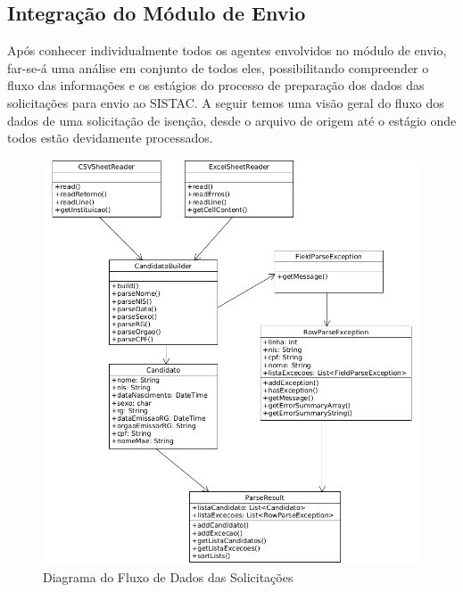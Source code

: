 \documentclass[
	12pt,			%
	openright,		%
	oneside,	
	a4paper,		%
	english,		%
	brazil			%
]{abntex2/abntex2}  %
\begin{document}
			\subsection{Integração do Módulo de Envio}
	
				Após conhecer individualmente todos os agentes envolvidos no módulo de envio, far-se-á uma análise em conjunto de todos eles, possibilitando compreender o fluxo das informações e os estágios do processo de preparação dos dados das solicitações para envio ao SISTAC. A seguir temos uma visão geral do fluxo dos dados de uma solicitação de isenção, desde o arquivo de origem até o estágio onde todos estão devidamente processados.

				\clearpage
				\begin{figure}[ht]
					\begin{center}
						
						\caption{Diagrama do Fluxo de Dados das Solicitações}
						\includegraphics[scale=0.6]{img/envio-uml}
						
					\end{center}
				\end{figure}
	
\end{document}
